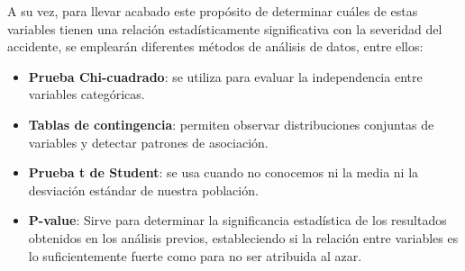\documentclass{book}
\begin{document}
 A su vez, para llevar acabado este propósito de determinar cuáles de estas variables tienen una relación estadísticamente significativa con la severidad del accidente, se emplearán diferentes métodos de análisis de datos, entre ellos:
\begin{itemize}
    \item \textbf{Prueba Chi-cuadrado}: se utiliza para evaluar la independencia entre variables categóricas.
    \item \textbf{Tablas de contingencia}: permiten observar distribuciones conjuntas de variables y detectar patrones de asociación.
    \item \textbf{Prueba t de Student}:  se usa cuando no conocemos ni la media ni la desviación estándar de nuestra población.
    \item \textbf{P-value}: Sirve para determinar la significancia estadística de los resultados obtenidos en los análisis previos, estableciendo si la relación entre variables es lo suficientemente fuerte como para no ser atribuida al azar.
\end{itemize}



\nocite{*}
\end{document}
